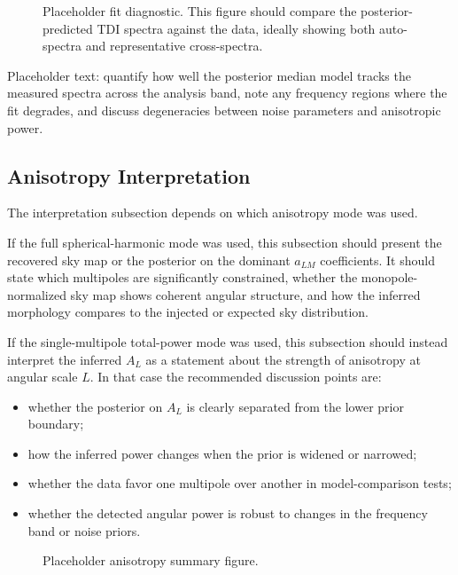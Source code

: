 \documentclass[11pt]{article}
\begin{document}
\begin{figure}[H]
\centering
{}
\caption{Placeholder fit diagnostic. This figure should compare the posterior-predicted TDI spectra against the data, ideally showing both auto-spectra and representative cross-spectra.}
\label{fig:fit}
\end{figure}

Placeholder text: quantify how well the posterior median model tracks the measured spectra across the analysis band, note any frequency regions where the fit degrades, and discuss degeneracies between noise parameters and anisotropic power.

\subsection{Anisotropy Interpretation}
The interpretation subsection depends on which anisotropy mode was used.

If the full spherical-harmonic mode was used, this subsection should present the recovered sky map or the posterior on the dominant $a_{LM}$ coefficients. It should state which multipoles are significantly constrained, whether the monopole-normalized sky map shows coherent angular structure, and how the inferred morphology compares to the injected or expected sky distribution.

If the single-multipole total-power mode was used, this subsection should instead interpret the inferred $A_L$ as a statement about the strength of anisotropy at angular scale $L$. In that case the recommended discussion points are:
\begin{itemize}
\item whether the posterior on $A_L$ is clearly separated from the lower prior boundary;
\item how the inferred power changes when the prior is widened or narrowed;
\item whether the data favor one multipole over another in model-comparison tests;
\item whether the detected angular power is robust to changes in the frequency band or noise priors.
\end{itemize}

\begin{figure}[H]
\centering
{}
\caption{Placeholder anisotropy summary figure.}
\label{fig:anisotropy}
\end{figure}
\end{document}
